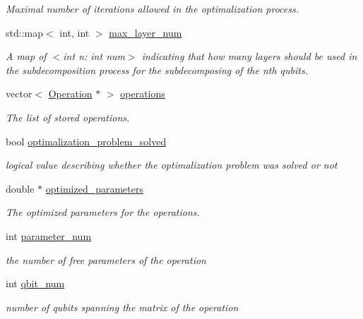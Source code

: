 \begin{DoxyCompactItemize}
\begin{DoxyCompactList}\small\item\em Maximal number of iterations allowed in the optimalization process. \end{DoxyCompactList}\item 
std\+::map$<$ int, int $>$ \hyperlink{class_decomposition___base_a861d7b10226fc13f05c131e18c8be908}{max\+\_\+layer\+\_\+num}
\begin{DoxyCompactList}\small\item\em A map of $<$int n\+: int num$>$ indicating that how many layers should be used in the subdecomposition process for the subdecomposing of the nth qubits. \end{DoxyCompactList}\item 
vector$<$ \hyperlink{class_operation}{Operation} $\ast$ $>$ \hyperlink{class_operation__block_a1efec4139888e591b59acd7b84497af1}{operations}
\begin{DoxyCompactList}\small\item\em The list of stored operations. \end{DoxyCompactList}\item 
bool \hyperlink{class_decomposition___base_ae9c42d3d9cdeeae765d6e7ebc2563d34}{optimalization\+\_\+problem\+\_\+solved}
\begin{DoxyCompactList}\small\item\em logical value describing whether the optimalization problem was solved or not \end{DoxyCompactList}\item 
double $\ast$ \hyperlink{class_decomposition___base_a38bb2fae99a99736eaafbf9741eb2f5d}{optimized\+\_\+parameters}
\begin{DoxyCompactList}\small\item\em The optimized parameters for the operations. \end{DoxyCompactList}\item 
int \hyperlink{class_operation_aa57505afe5b5ec27f6d053044b86e043}{parameter\+\_\+num}
\begin{DoxyCompactList}\small\item\em the number of free parameters of the operation \end{DoxyCompactList}\item 
int \hyperlink{class_operation_aecd5fbf1dd4ea532b2e58471ff8bad69}{qbit\+\_\+num}
\begin{DoxyCompactList}\small\item\em number of qubits spanning the matrix of the operation \end{DoxyCompactList}\item 

\end{DoxyCompactItemize}
